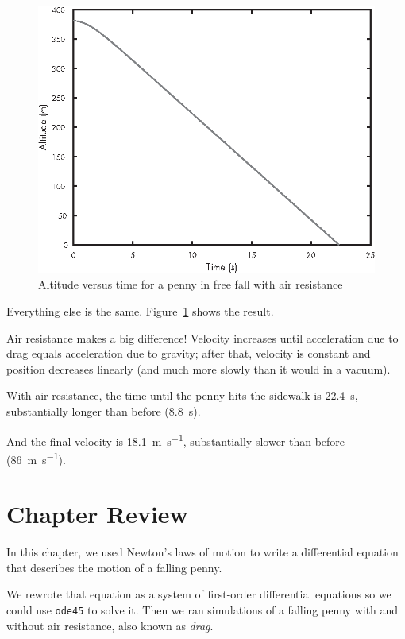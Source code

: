 \begin{figure}[ht]
\includegraphics{images/figure11_02_new.eps}
\caption{Altitude versus time for a penny in free fall with air resistance}
\label{fig:penny2}
\end{figure}

Everything else is the same.  Figure~\ref{fig:penny2} shows the result. 

Air resistance makes a big difference! Velocity increases until
acceleration due to drag equals acceleration due to gravity; after that, velocity is constant and position decreases linearly (and much more slowly than it would in a vacuum).

With air resistance, the time until the penny hits the sidewalk is \SI{22.4}{\second}, substantially longer than before (\SI{8.8}{\second}).

And the final velocity is \SI{18.1}{\meter \per \second}, substantially slower than before (\SI{86}{\meter \per \second}).

\section{Chapter Review}

In this chapter, we used Newton's laws of motion to write a differential equation that describes the motion of a falling penny.  

We rewrote that equation as a system of first-order differential equations so we could use \lstinline{ode45} to solve it.  Then we ran simulations of a falling penny with and without air resistance, also known as \emph{drag}.

